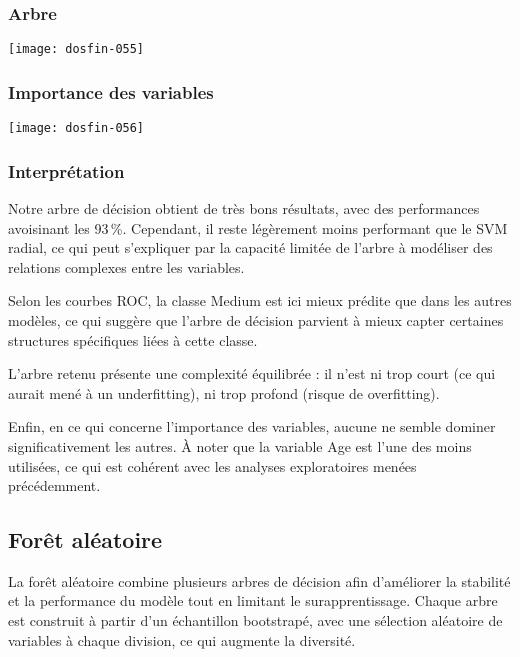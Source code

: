 \documentclass[a4paper,11pt]{article}
\begin{document}
\subsubsection{Arbre}

\begin{center}

\texttt{[image: dosfin-055]}

\end{center}

\subsubsection{Importance des variables}

\begin{center}

\texttt{[image: dosfin-056]}

\end{center}

\subsubsection{Interprétation}

Notre arbre de décision obtient de très bons résultats, avec des performances avoisinant les 93\,\%.  
Cependant, il reste légèrement moins performant que le SVM radial, ce qui peut s’expliquer par la capacité limitée de l’arbre à modéliser des relations complexes entre les variables.

Selon les courbes ROC, la classe Medium est ici mieux prédite que dans les autres modèles, ce qui suggère que l’arbre de décision parvient à mieux capter certaines structures spécifiques liées à cette classe.

L’arbre retenu présente une complexité équilibrée : il n’est ni trop court (ce qui aurait mené à un underfitting), ni trop profond (risque de overfitting).

Enfin, en ce qui concerne l’importance des variables, aucune ne semble dominer significativement les autres.  
À noter que la variable Age est l’une des moins utilisées, ce qui est cohérent avec les analyses exploratoires menées précédemment.

\newpage

\subsection{Forêt aléatoire}

La forêt aléatoire combine plusieurs arbres de décision afin d'améliorer la stabilité et la performance du modèle tout en limitant le surapprentissage.  
Chaque arbre est construit à partir d’un échantillon bootstrapé, avec une sélection aléatoire de variables à chaque division, ce qui augmente la diversité.
\end{document}
